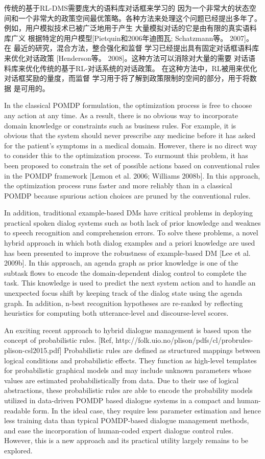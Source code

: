 \begin{enumerate}
传统的基于RL-DMS需要庞大的语料库对话框来学习的
因为一个非常大的状态空间和一个非常大的政策空间最优策略。各种方法来处理这个问题已经提出多年了。例如，用户模拟技术已被广泛地用于产生
大量模拟对话的它是由有限的真实语料库广义
根据特定的用户模型[Pietquin和2006年迪图瓦; Schatzmann等。 2007]。 在
最近的研究，混合方法，整合强化和监督
学习已经提出具有固定对话框语料库来优化对话政策
[Henderson等。 2008]。这种方法可以消除对大量的需要
对话语料库来优化传统的基于RL-对话系统的对话政策。
在这种方法中，RL被用来优化对话框奖励的量度，而监督
学习用于将了解到政策限制的空间的部分，用于将数据
是可用的。

In the classical POMDP formulation, the optimization process is free to choose any
action at any time. As a result, there is no obvious way to incorporate domain
knowledge or constraints such as business rules. For example, it is obvious that the
system should never prescribe any medicine before it has asked for the patient's
symptoms in a medical domain. However, there is no direct way to consider this to
the optimization process.  To surmount this problem, it has been proposed to constrain the set of
possible actions based on conventional rules in the POMDP framework [Lemon et al.
2006; Williams 2008b]. In this approach, the optimization process runs faster and
more reliably than in a classical POMDP because spurious action choices are pruned
by the conventional rules.

In addition, traditional example-based DMs have critical problems in deploying
practical spoken dialog systems such as both lack of prior knowledge and weaknes
to speech recognition and  comprehension errors. To solve these problems, a novel hybrid approach in which both dialog examples and a priori knowledge are used has been presented to improve
the robustness of example-based DM [Lee et al. 2009b]. In this approach, an agenda
graph as prior knowledge is one of the subtask flows to encode the domain-dependent
dialog control to complete the task. This knowledge is used to predict the next system
action and to handle an unexpected focus shift by keeping track of the dialog state
using the agenda graph. In addition, n-best recognition hypotheses are re-ranked by
reflecting heuristics for computing both utterance-level and discourse-level scores.

An exciting recent approach to hybrid dialogue management is based upon
the concept of probabilistic rules.   [Ref, http://folk.uio.no/plison/pdfs/cl/probrules-plison-csl2015.pdf]
Probabilistic rules are defined as structured mappings between logical
conditions and probabilistic effects.
They function as high-level templates
for probabilistic graphical models and may include unknown parameters whose values are estimated probabilistically from data.   Due to their use of logical abstractions, these probabilistic rules are able to encode the probability models utilized in data-driven POMDP based dialogue systems in a compact and human-readable form.  In the ideal case, they require less  parameter estimation and hence less training data than typical POMDP-based dialogue management methods, and ease the incorporation of human-coded expert dialogue control rules.   However, this is a new approach and its practical utility largely remains to be explored.


\end{enumerate}
